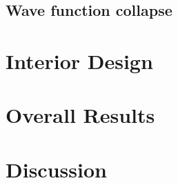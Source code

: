 \documentclass[
oneside,
fontsize=11pt
]{scrartcl}
\begin{document}
\subsection{Wave function collapse}







\section{Interior Design}

\section{Overall Results}

\section{Discussion}




\newpage
\appendix  %




\end{document}
